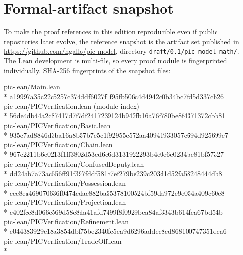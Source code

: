 \documentclass[10pt,oneside,openany]{book}
\newcommand{\mono}[1]{\texttt{#1}}
\begin{document}
\section{Formal-artifact snapshot}
To make the proof references in this edition reproducible even if public repositories later evolve, the reference snapshot is the artifact set published in \url{https://github.com/ngallo/pic-model}, directory \mono{draft/0.1/pic-model-math/}. The Lean development is multi-file, so every proof module is fingerprinted individually. SHA-256 fingerprints of the snapshot files:

{\scriptsize\ttfamily\raggedright
pic-lean/Main.lean\\*
\hspace*{1.2em}a19997a35c22c5257c374ddf6027f1f95fb506c4d4942c0b34bc7fd5d337cb26\\
pic-lean/PICVerification.lean (module index)\\*
\hspace*{1.2em}56de4db44a2c87417d7f7df2417239124b942fb16a76f780be8f4371372cbb81\\
pic-lean/PICVerification/Basic.lean\\*
\hspace*{1.2em}935c7ad8846d3ba16a8b57b7e5c1f92955e572aa40941933057c694d925699e7\\
pic-lean/PICVerification/Chain.lean\\*
\hspace*{1.2em}967c2211b6e0213f1ff3802d53ed6c6d3131922293b4e0e6c0234be81bf57327\\
pic-lean/PICVerification/ConfusedDeputy.lean\\*
\hspace*{1.2em}dd24ab7a73ac556ff91f397fddf581c7ef279be239c203d1d52fa58248444db8\\
pic-lean/PICVerification/Possession.lean\\*
\hspace*{1.2em}cee8ea469070636f0474cdac882ba55378100524bf59da972e9e054a409c60e8\\
pic-lean/PICVerification/Projection.lean\\*
\hspace*{1.2em}c402fcc8d066e569d58e8da41afd7499f8f0929bea84af3343b614fea67bd54b\\
pic-lean/PICVerification/Refinement.lean\\*
\hspace*{1.2em}e044383929c18a3854dbf75be2340fe5ea9d6296addec8cd868100747351dca6\\
pic-lean/PICVerification/TradeOff.lean\\*
}
\end{document}
